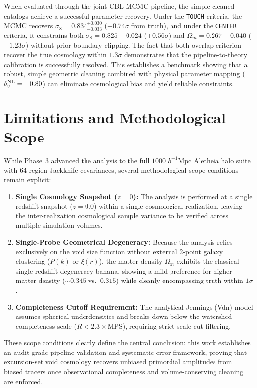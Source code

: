 \documentclass[12pt]{report}
\begin{document}
When evaluated through the joint CBL MCMC pipeline, the simple-cleaned catalogs achieve a successful parameter recovery. Under the \texttt{TOUCH} criteria, the MCMC recovers $\sigma_8 = 0.834^{+0.030}_{-0.033}$ ($+0.74\sigma$ from truth), and under the \texttt{CENTER} criteria, it constrains both $\sigma_8 = 0.825 \pm 0.024$ ($+0.56\sigma$) and $\Omega_m = 0.267 \pm 0.040$ ($-1.23\sigma$) without prior boundary clipping. The fact that both overlap criterion recover the true cosmology within $1.3\sigma$ demonstrates that the pipeline-to-theory calibration is successfully resolved. This establishes a benchmark showing that a robust, simple geometric cleaning combined with physical parameter mapping ($\delta_v^{\rm NL} = -0.80$) can eliminate cosmological bias and yield reliable constraints.

\section{Limitations and Methodological Scope}

While Phase~3 advanced the analysis to the full $1000\;h^{-1}\mathrm{Mpc}$ Aletheia halo suite with 64-region Jackknife covariances, several methodological scope conditions remain explicit:
\begin{enumerate}
    \item \textbf{Single Cosmology Snapshot ($z=0$):} The analysis is performed at a single redshift snapshot ($z=0.0$) within a single cosmological realization, leaving the inter-realization cosmological sample variance to be verified across multiple simulation volumes.
    \item \textbf{Single-Probe Geometrical Degeneracy:} Because the analysis relies exclusively on the void size function without external 2-point galaxy clustering ($P(k)$ or $\xi(r)$), the matter density $\Omega_m$ exhibits the classical single-redshift degeneracy banana, showing a mild preference for higher matter density ($\sim 0.345$ vs.\ $0.315$) while cleanly encompassing truth within $1\sigma$.
    \item \textbf{Completeness Cutoff Requirement:} The analytical Jennings (Vdn) model assumes spherical underdensities and breaks down below the watershed completeness scale ($R < 2.3 \times \mathrm{MPS}$), requiring strict scale-cut filtering.
\end{enumerate}

These scope conditions clearly define the central conclusion: this work establishes an audit-grade pipeline-validation and systematic-error framework, proving that excursion-set void cosmology recovers unbiased primordial amplitudes from biased tracers once observational completeness and volume-conserving cleaning are enforced.
\end{document}
